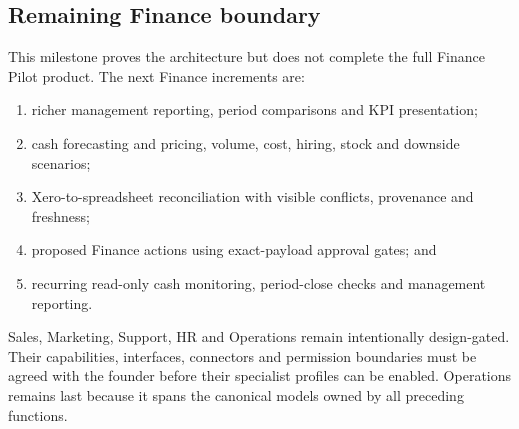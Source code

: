 \subsection{Remaining Finance boundary}

This milestone proves the architecture but does not complete the full Finance Pilot product.  The next Finance increments are:
\begin{enumerate}
  \item richer management reporting, period comparisons and KPI presentation;
  \item cash forecasting and pricing, volume, cost, hiring, stock and downside scenarios;
  \item Xero-to-spreadsheet reconciliation with visible conflicts, provenance and freshness;
  \item proposed Finance actions using exact-payload approval gates; and
  \item recurring read-only cash monitoring, period-close checks and management reporting.
\end{enumerate}

Sales, Marketing, Support, HR and Operations remain intentionally design-gated.  Their capabilities, interfaces, connectors and permission boundaries must be agreed with the founder before their specialist profiles can be enabled.  Operations remains last because it spans the canonical models owned by all preceding functions.

